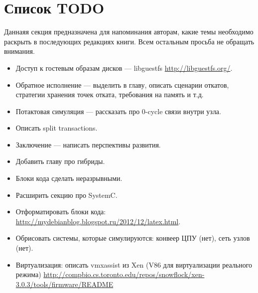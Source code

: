 \section*{Список TODO}

Даннаяя секция предназначена для напоминания авторам, какие темы необходимо раскрыть в последующих редакциях книги. Всем остальным просьба не обращать внимания.

\begin{itemize}
    \item Доступ к гостевым образам дисков — libguestfs \url{http://libguestfs.org/}.
    \item Обратное исполнение — выделить в главу, описать сценарии откатов, стратегии хранения точек отката, требования на память и т.д.
    \item Потактовая симуляция — рассказать про 0-cycle связи внутри узла.
    \item Описать split transactions.
    \item Заключение — написать перспективы развития.
	\item Добавить главу про гибриды.
	\item Блоки кода сделать неразрывными.
	\item Расширить секцию про SystemC.
	\item Отформатировать блоки кода: \url{http://mydebianblog.blogspot.ru/2012/12/latex.html}.
    \item Обрисовать системы, которые симулируются: конвеер ЦПУ (нет), сеть узлов (нет).
    \item Виртуализация: описать vmxassist из Xen (V86 для виртуализации реального режима) \url{http://compbio.cs.toronto.edu/repos/snowflock/xen-3.0.3/tools/firmware/README}
\end{itemize}


 


